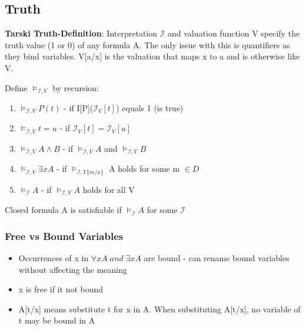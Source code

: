 \documentclass{article}
\begin{document}
\subsection{Truth}
\textbf{Tarski Truth-Definition}: Interpretation $\mathcal{I}$ and valuation function V specify the truth value (1 or 0) of any formula A. The only issue with this is quantifiers as they bind variables. V[a/x] is the valuation that maps x to a and is otherwise like V.

Define $\vDash_{\mathcal{I}, V}$ by recursion:
\begin{enumerate}
    \item $\vDash_{\mathcal{I}, V} P(t)$ - if I[P]($\mathcal{I}_{V}[t]$) equals 1 (is true) 
    
    \item $\vDash_{\mathcal{I}, V} t = u$ - if $\mathcal{I}_{V}[t] = \mathcal{I}_{V}[u]$
    
    \item $\vDash_{\mathcal{I}, V} A \wedge B$ - if $\vDash_{\mathcal{I}, V} A$ and $\vDash_{\mathcal{I}, V} B$
    
    \item $\vDash_{\mathcal{I}, V} \exists x A$ - if $\vDash_{\mathcal{I}, V \{ m / x \}}$ A holds for some m $\in D$
    
    \item $\vDash_{\mathcal{I}} A$ - if $\vDash_{\mathcal{I}, V} A$ holds for all V
\end{enumerate}

Closed formula A is satisfiable if $\vDash_{\mathcal{I}}A$ for some $\mathcal{I}$

\subsubsection{Free vs Bound Variables}
\begin{itemize}
    \item Occurrences of x in $\forall x A \; and \; \exists x A$ are bound - can rename bound variables without affecting the meaning
    \item x is free if it not bound
    \item A[t/x] means substitute t for x in A. When substituting A[t/x], no variable of t may be bound in A
\end{itemize}
\end{document}
